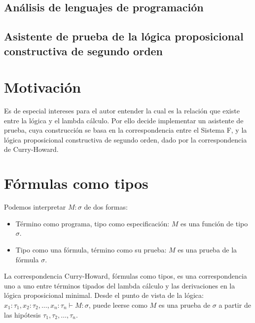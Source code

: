 \documentclass[a4paper,11pt]{article}
\title{}
\author{}
\theoremstyle{definition}
\theoremstyle{remark}
\begin{document}
\maketitle 

\thispagestyle{empty}
\begin{center}
\section*{Análisis de lenguajes de programación} 
\subsection*{Asistente de prueba de la lógica proposicional constructiva de segundo orden}
\end{center}

\newpage{\pagestyle{empty}\cleardoublepage}

\tableofcontents

\newpage


\section{Motivación}
Es de especial intereses para el autor entender la cual es la relación que existe entre la lógica y el lambda cálculo.
Por ello decide implementar un asistente de prueba, cuya construcción se basa en la correspondencia
entre el Sistema F, y la lógica proposicional constructiva de segundo orden, dado por la correspondencia de Curry-Howard.
 
\section{Fórmulas como tipos}
Podemos interpretar $M : \sigma$ de dos formas:
\begin{itemize}
  \item Término como programa, tipo como especificación: $M$ es una función de tipo $\sigma$.
  \item Tipo como una fórmula, término como su prueba: $M$ es una prueba de la fórmula $\sigma$.
\end{itemize}

La correspondencia Curry-Howard, fórmulas como tipos, es una correspondencia uno a uno entre términos
tipados del lambda cálculo y las derivaciones en la lógica proposicional minimal.
Desde el punto de vista de la lógica: $x_{1}:\tau_{1}, x_{2}:\tau_{2}, \ldots, x_{n}:\tau_{n} \vdash M : \sigma$,
puede leerse como $M$ es una prueba de $\sigma$ a partir de las hipótesis $\tau_{1}, \tau_{2}, \ldots, \tau_{n}$.  
 
\end{document}
